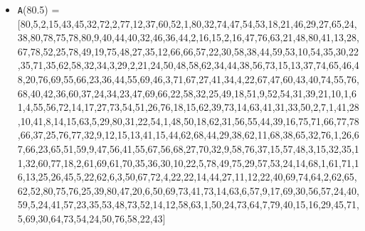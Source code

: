 \documentclass[runningheads,a4paper]{llncs}
\begin{document}
\begin{itemize}
	\item {\texttt A(80.5) = } [80,5,2,15,43,45,32,72,2,77,12,37,60,52,1,80,32,74,47,54,53,18,21,46,29,27,65,24,38,80,78,75,78,80,9,40,44,40,32,46,36,44,2,16,15,2,16,47,76,63,21,48,80,41,13,28,67,78,52,25,78,49,19,75,48,27,35,12,66,66,57,22,30,58,38,44,59,53,10,54,35,30,22,35,71,35,62,58,32,34,3,29,2,21,24,50,48,58,62,34,44,38,56,73,15,13,37,74,65,46,48,20,76,69,55,66,23,36,44,55,69,46,3,71,67,27,41,34,4,22,67,47,60,43,40,74,55,76,68,40,42,36,60,37,24,34,23,47,69,66,22,58,32,25,49,18,51,9,52,54,31,39,21,10,1,61,4,55,56,72,14,17,27,73,54,51,26,76,18,15,62,39,73,14,63,41,31,33,50,2,7,1,41,28,10,41,8,14,15,63,5,29,80,31,22,54,1,48,50,18,62,31,56,55,44,39,16,75,71,66,77,78,66,37,25,76,77,32,9,12,15,13,41,15,44,62,68,44,29,38,62,11,68,38,65,32,76,1,26,67,66,23,65,51,59,9,47,56,41,55,67,56,68,27,70,32,9,58,76,37,15,57,48,3,15,32,35,11,32,60,77,18,2,61,69,61,70,35,36,30,10,22,5,78,49,75,29,57,53,24,14,68,1,61,71,16,13,25,26,45,5,22,62,6,3,50,67,72,4,22,22,14,44,27,11,12,22,40,69,74,64,2,62,65,62,52,80,75,76,25,39,80,47,20,6,50,69,73,41,73,14,63,6,57,9,17,69,30,56,57,24,40,59,5,24,41,57,23,35,53,48,73,52,14,12,58,63,1,50,24,73,64,7,79,40,15,16,29,45,71,5,69,30,64,73,54,24,50,76,58,22,43]
	

\end{itemize}
\end{document}
